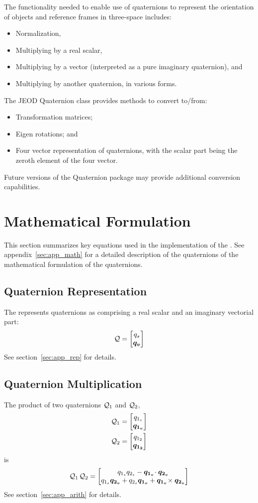 The functionality needed to enable use of quaternions to represent the  
orientation of objects and reference frames in three-space includes:
\begin{itemize}
\item Normalization,
\item Multiplying by a real scalar,
\item Multiplying by a vector (interpreted as a pure imaginary quaternion), and
\item Multiplying by another quaternion, in various forms.
\end{itemize}

The JEOD Quaternion class provides methods to convert to/from:
\begin{itemize}
\item Transformation matrices;
\item Eigen rotations; and
\item Four vector representation of quaternions, with the scalar part  
being the zeroth element of the four vector.
\end{itemize}
Future versions of the Quaternion package may provide additional  
conversion capabilities.


\section{Mathematical Formulation}
This section summarizes key equations used in the implementation
of the \ModelDesc. See appendix~\ref{sec:app_math}
for a detailed description of the quaternions of the mathematical
formulation of the quaternions.

\subsection{Quaternion Representation}
The \ModelDesc represents quaternions as comprising a real scalar
and an imaginary vectorial part:
\begin{equation}
\quat Q = \quatsv {q_s} {\vect {q_v}}
\end{equation}
See section~\ref{sec:app_rep} for details.

\subsection{Quaternion Multiplication}
The product of two quaternions $\mathcal{Q}_1$ and $\mathcal{Q}_2$,
\begin{align*}
\quat{Q}_1 &= \quatsv {q_{1_s}} {\vect {q_{1_v}}} \\
\quat{Q}_2 &= \quatsv {q_{1_2}} {\vect {q_{1_2}}}
\end{align*}
is
\begin{equation}
\QxQ{\quat{Q}_1}{\quat{Q}_2} = 
  \quatsv
    {q_{1_s} q_{2_s} - \vect{q_{1_v}} \!\cdot \vect{q_{2_v}}}
    {q_{1_s} \vect{q_{2_v}} +
     q_{2_s} \vect{q_{1_v}} +
     \vect{q_{1_v}} \!\times \vect{q_{2_v}}}
  \label{eqn:mform:quat_prod_short}
\end{equation}
See section~\ref{sec:app_arith} for details.

